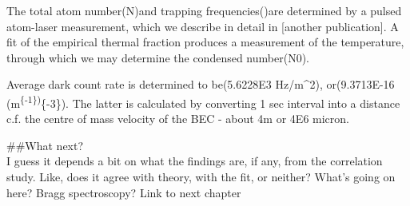 The total atom number(N)and trapping frequencies(\omegai)are determined
by a pulsed atom-laser measurement, which we describe in detail in
{[}another publication{]}. A fit of the empirical thermal fraction
produces a measurement of the temperature, through which we may
determine the condensed number(N0).

Average dark count rate is determined to be(5.6228E3 Hz/m\^{}2),
or(9.3713E-16 (m\textsuperscript{\{-1\})}\{-3\}). The latter is
calculated by converting 1 sec interval into a distance c.f. the centre
of mass velocity of the BEC - about 4m or 4E6 micron.

\#\#What next?\\
I guess it depends a bit on what the findings are, if any, from the
correlation study. Like, does it agree with theory, with the fit, or
neither? What's going on here? Bragg spectroscopy? Link to next chapter
